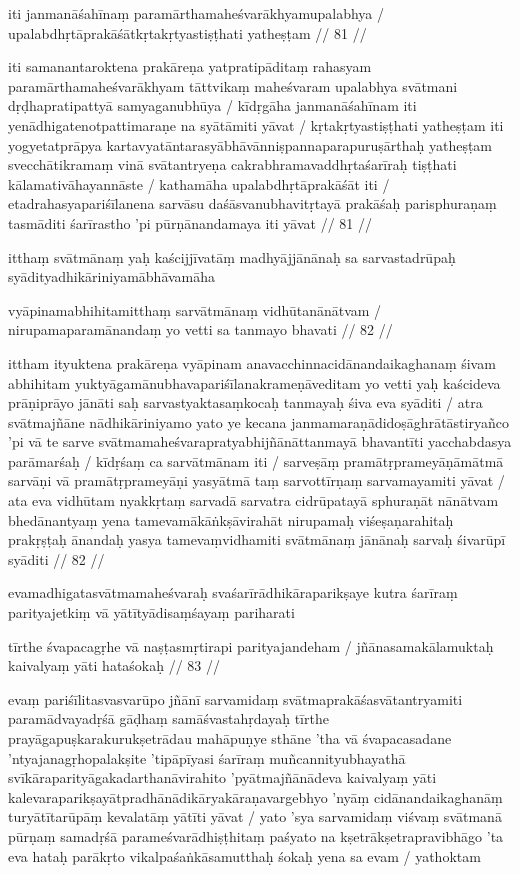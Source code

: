 iti janmanāśahīnaṃ paramārthamaheśvarākhyamupalabhya  /
upalabdhṛtāprakāśātkṛtakṛtyastiṣṭhati yatheṣṭam  // 81  //

iti samanantaroktena prakāreṇa yatpratipāditaṃ rahasyam paramārthamaheśvarākhyam tāttvikaṃ maheśvaram upalabhya svātmani dṛḍhapratipattyā samyaganubhūya  / kīdṛgāha janmanāśahīnam iti yenādhigatenotpattimaraṇe na syātāmiti yāvat  / kṛtakṛtyastiṣṭhati yatheṣṭam iti yogyetatprāpya kartavyatāntarasyābhāvānniṣpannaparapuruṣārthaḥ yatheṣṭam svecchātikramaṃ vinā svātantryeṇa cakrabhramavaddhṛtaśarīraḥ tiṣṭhati kālamativāhayannāste  / kathamāha upalabdhṛtāprakāśāt iti  / etadrahasyapariśīlanena sarvāsu daśāsvanubhavitṛtayā prakāśaḥ parisphuraṇaṃ tasmāditi śarīrastho 'pi pūrṇānandamaya iti yāvat  // 81  //

itthaṃ svātmānaṃ yaḥ kaścijjīvatāṃ madhyājjānānaḥ sa sarvastadrūpaḥ syādityadhikāriniyamābhāvamāha

vyāpinamabhihitamitthaṃ sarvātmānaṃ vidhūtanānātvam  /
nirupamaparamānandaṃ yo vetti sa tanmayo bhavati  // 82  //

ittham ityuktena prakāreṇa vyāpinam anavacchinnacidānandaikaghanaṃ śivam abhihitam yuktyāgamānubhavapariśīlanakrameṇāveditam yo vetti yaḥ kaścideva prāṇiprāyo jānāti saḥ sarvastyaktasaṃkocaḥ tanmayaḥ śiva eva syāditi  / atra svātmajñāne nādhikāriniyamo yato ye kecana janmamaraṇādidoṣāghrātāstiryañco 'pi vā te sarve svātmamaheśvarapratyabhijñānāttanmayā bhavantīti yacchabdasya parāmarśaḥ  / kīdṛśaṃ ca sarvātmānam iti  / sarveṣāṃ pramātṛprameyāṇāmātmā sarvāṇi vā pramātṛprameyāṇi yasyātmā taṃ sarvottīrṇaṃ sarvamayamiti yāvat  / ata eva vidhūtam nyakkṛtaṃ sarvadā sarvatra cidrūpatayā sphuraṇāt nānātvam bhedānantyaṃ yena tamevamākāṅkṣāvirahāt nirupamaḥ viśeṣaṇarahitaḥ prakṛṣṭaḥ ānandaḥ yasya tamevaṃvidhamiti svātmānaṃ jānānaḥ sarvaḥ śivarūpī syāditi  // 82  //

evamadhigatasvātmamaheśvaraḥ svaśarīrādhikāraparikṣaye kutra śarīraṃ parityajetkiṃ vā yātītyādisaṃśayaṃ pariharati

tīrthe śvapacagṛhe vā naṣṭasmṛtirapi parityajandeham  /
jñānasamakālamuktaḥ kaivalyaṃ yāti hataśokaḥ  // 83  //

evaṃ pariśīlitasvasvarūpo jñānī sarvamidaṃ svātmaprakāśasvātantryamiti paramādvayadṛśā gāḍhaṃ samāśvastahṛdayaḥ tīrthe prayāgapuṣkarakurukṣetrādau mahāpuṇye sthāne 'tha vā śvapacasadane 'ntyajanagṛhopalakṣite 'tipāpīyasi śarīraṃ muñcannityubhayathā svīkāraparityāgakadarthanāvirahito 'pyātmajñānādeva kaivalyaṃ yāti kalevaraparikṣayātpradhānādikāryakāraṇavargebhyo 'nyāṃ cidānandaikaghanāṃ turyātītarūpāṃ kevalatāṃ yātīti yāvat  / yato 'sya sarvamidaṃ viśvaṃ svātmanā pūrṇaṃ samadṛśā parameśvarādhiṣṭhitaṃ paśyato na kṣetrākṣetrapravibhāgo 'ta eva hataḥ parākṛto vikalpaśaṅkāsamutthaḥ śokaḥ yena sa evam  / yathoktam

